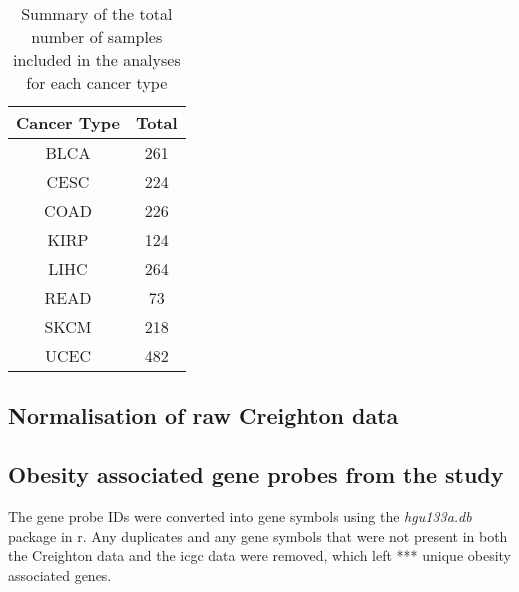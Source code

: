 \begin{table}[h]
	\caption{Summary of the total number of samples included in the analyses for each cancer type}
	\label{tab:samplesize}
	\begin{center}
		\begin{tabular}{cc}
			\textbf{Cancer Type}   & \textbf{Total} \\
			\hline
			\rule{0pt}{2.25ex}BLCA & 261   \\
			CESC                   & 224   \\
			COAD                   & 226   \\
			KIRP                   & 124   \\
			LIHC                   & 264   \\
			READ                   & 73    \\
			SKCM                   & 218   \\
			UCEC                   & 482   \\
		\end{tabular}
	\end{center}
\end{table}


\subsection{Normalisation of raw Creighton data}
\label{subsec:normcrdata}


\subsection{Obesity associated gene probes from the \citet{Creighton2012} study}
\label{subsec:crobsgene}

The gene probe IDs were converted into gene symbols using the \textit{hgu133a.db} package in \gls{r}.
Any duplicates and any gene symbols that were not present in both the Creighton data and the \gls{icgc} data were removed, which left *** unique obesity associated genes.







